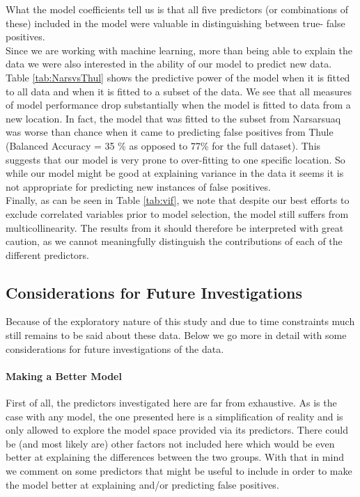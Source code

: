\documentclass[12pt]{article}
\begin{document}
What the model coefficients tell us is that all five predictors (or combinations of these) included in the model were valuable in distinguishing between true- false positives.\\

Since we are working with machine learning, more than being able to explain the data we were also interested in the ability of our model to predict new data. Table \ref{tab:NarsvsThul} shows the predictive power of the model when it is fitted to all data and when it is fitted to a subset of the data. We see that all measures of model performance drop substantially when the model is fitted to data from a new location. In fact, the model that was fitted to the subset from Narsarsuaq was worse than chance when it came to predicting false positives from Thule (Balanced Accuracy = 35 \% as opposed to 77\% for the full dataset). This suggests that our model is very prone to over-fitting to one specific location. So while our model might be good at explaining variance in the data it seems it is not appropriate for predicting new instances of false positives.\\

Finally, as can be seen in Table \ref{tab:vif}, we note that despite our best efforts to exclude correlated variables prior to model selection, the model still suffers from multicollinearity. The results from it should therefore be interpreted with great caution, as we cannot meaningfully distinguish the contributions of each of the different predictors.

\subsection{Considerations for Future Investigations}
Because of the exploratory nature of this study and due to time constraints much still remains to be said about these data. Below we go more in detail with some considerations for future investigations of the data.

\paragraph{Making a Better Model}
First of all, the predictors investigated here are far from exhaustive. As is the case with any model, the one presented here is a simplification of reality and is only allowed to explore the model space provided via its predictors. There could be (and most likely are) other factors not included here which would be even better at explaining the differences between the two groups. With that in mind we comment on some predictors that might be useful to include in order to make the model better at explaining and/or predicting false positives.\\
\end{document}
